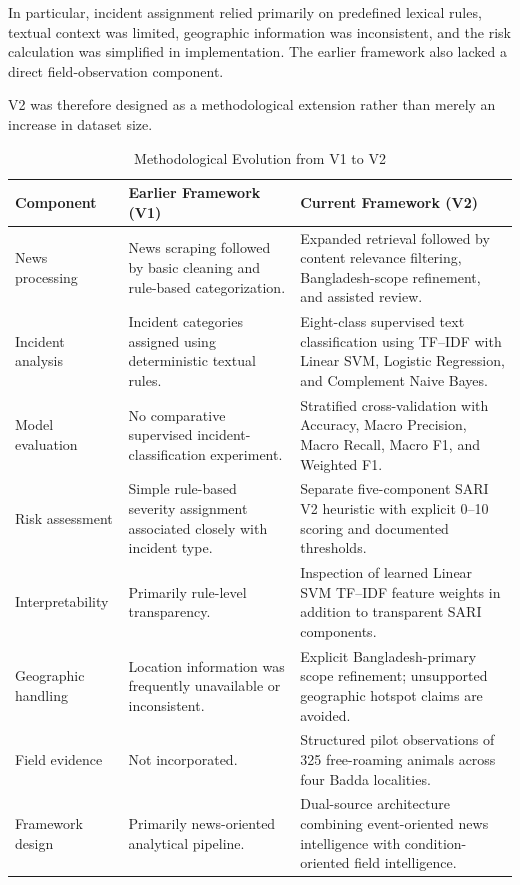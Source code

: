 \documentclass[conference]{IEEEtran}
\begin{document}
In particular, incident assignment relied primarily on predefined lexical
rules, textual context was limited, geographic information was inconsistent,
and the risk calculation was simplified in implementation. The earlier
framework also lacked a direct field-observation component.

V2 was therefore designed as a methodological extension rather than merely
an increase in dataset size.

\begin{table}[!t]
\centering
\caption{Methodological Evolution from V1 to V2}
\label{tab:v1_v2}
\renewcommand{\arraystretch}{1.18}
\begin{tabular}{p{}p{}p{}}
\toprule
\textbf{Component} & \textbf{Earlier Framework (V1)} &
\textbf{Current Framework (V2)} \\
\midrule

News processing &
News scraping followed by basic cleaning and rule-based categorization. &
Expanded retrieval followed by content relevance filtering, Bangladesh-scope
refinement, and assisted review. \\

Incident analysis &
Incident categories assigned using deterministic textual rules. &
Eight-class supervised text classification using TF--IDF with Linear SVM,
Logistic Regression, and Complement Naive Bayes. \\

Model evaluation &
No comparative supervised incident-classification experiment. &
Stratified cross-validation with Accuracy, Macro Precision, Macro Recall,
Macro F1, and Weighted F1. \\

Risk assessment &
Simple rule-based severity assignment associated closely with incident type. &
Separate five-component SARI V2 heuristic with explicit 0--10 scoring and
documented thresholds. \\

Interpretability &
Primarily rule-level transparency. &
Inspection of learned Linear SVM TF--IDF feature weights in addition to
transparent SARI components. \\

Geographic handling &
Location information was frequently unavailable or inconsistent. &
Explicit Bangladesh-primary scope refinement; unsupported geographic hotspot
claims are avoided. \\

Field evidence &
Not incorporated. &
Structured pilot observations of 325 free-roaming animals across four Badda
localities. \\

Framework design &
Primarily news-oriented analytical pipeline. &
Dual-source architecture combining event-oriented news intelligence with
condition-oriented field intelligence. \\

\bottomrule
\end{tabular}
\end{table}
\end{document}
